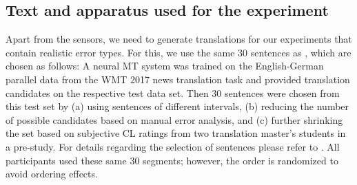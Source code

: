 \documentclass[output=paper]{langsci/langscibook}
\begin{document}
\subsection{Text and apparatus used for the experiment}
Apart from the sensors, we need to generate translations for our experiments that contain realistic error types. For this, we use the same 30 sentences as \citet{herbig2019mt}, which are chosen as follows: %
A neural MT system \citep{Gehring:2017:fair} was trained on the English-German parallel data from the WMT 2017 news translation task and provided translation candidates on the respective test data set. %
Then 30 sentences were chosen from this test set by (a) using sentences of different \ter{} intervals, (b) reducing the number of possible candidates based on manual error analysis, and (c) further shrinking the set based on subjective CL ratings from two translation master's students in a pre-study. For details regarding the selection of sentences please refer to \cite{herbig2019mt}.
All participants used these same 30 segments; however, the order is randomized to avoid ordering effects. %
\end{document}
